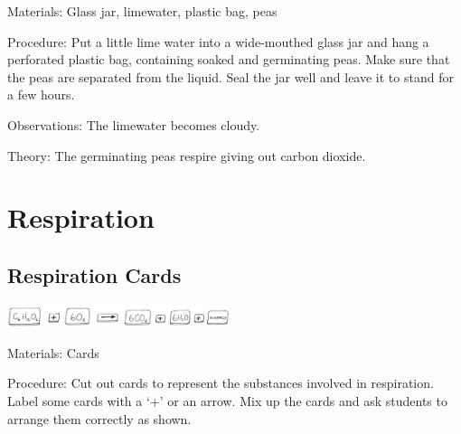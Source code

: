 \begin{multicols}{2}
\begin{description*}
\item[Materials:]{Glass jar, limewater, plastic bag, peas}
\item[Procedure:]{Put a little lime water into a wide-mouthed glass jar and hang a perforated plastic bag,
containing soaked and germinating peas. Make sure that the peas are separated from the
liquid. Seal the jar well and leave it to stand for a few hours.}
\item[Observations:]{The limewater becomes cloudy.}
\item[Theory:]{The germinating peas respire giving out carbon dioxide.}
\end{description*}


\section*{Respiration}


\subsection{Respiration Cards} %

\begin{center}
\includegraphics[width=0.49\textwidth]{./img/vso/respiration-cards.jpg}
\end{center}

\begin{description*}
\item[Materials:]{Cards}
\item[Procedure:]{Cut out cards to represent the substances involved in respiration. Label
some cards with a `+' or an arrow. Mix up the cards and ask students to
arrange them correctly as shown.}
\end{description*}


\end{multicols}
